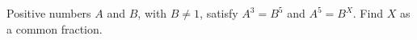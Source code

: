 Positive numbers $A$ and $B$, with $B\ne1$, satisfy $A^3=B^5$ and $A^5=B^X$. Find $X$ as a common fraction.

